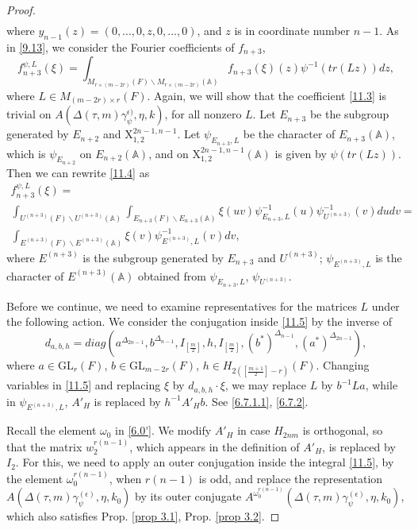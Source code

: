 \documentclass[12pts]{amsart}
\newcommand{\BA}{{\mathbb {A}}}
\newcommand{\GL}{{\mathrm{GL}}}
\begin{document}
\begin{proof}
\begin{multline}
\end{multline}
where $y_{n-1}(z)=(0,...,0,z,0,...,0)$, and $z$ is in coordinate number $n-1$. As in \eqref{9.13}, we consider the Fourier coefficients of $f_{n+3}$,  
\begin{equation}\label{11.4}
f_{n+3}^{\psi,L}(\xi)=\int_{M_{r\times (m-2r)}(F)\backslash M_{r\times (m-2r)}(\BA)}f_{n+3}(\xi)(z)\psi^{-1}(tr(Lz))dz,
\end{equation}
where $L\in M_{(m-2r)\times r}(F)$. Again, we will show that the coefficient \eqref{11.3} is trivial on $A(\Delta(\tau,m)\gamma_\psi^{\epsilon)},\eta,k)$, for all nonzero $L$. Let $E_{n+3}$ be the subgroup generated by $E_{n+2}$ and $\mathrm{X}_{1,2}^{2n-1,n-1}$. Let $\psi_{E_{n+3},L}$ be the character of $E_{n+3}(\BA)$, which is $\psi_{E_{n+2}}$ on $E_{n+2}(\BA)$, and on $\mathrm{X}_{1,2}^{2n-1,n-1}(\BA)$ is given by $\psi(tr(Lz))$. Then we can rewrite \eqref{11.4} as
\begin{multline}\label{11.5}
f_{n+3}^{\psi,L}(\xi)=\\
\int_{U^{(n+3)}(F)\backslash
	U^{(n+3)}(\BA)}\int_{E_{n+3}(F)\backslash E_{n+3}(\BA)}\xi(uv)\psi^{-1}_{E_{n+3},L}(u)\psi^{-1}_{U^{(n+3)}}(v)dudv=\\
\int_{E^{(n+3)}(F)\backslash
	E^{(n+3)}(\BA)}\xi(v)\psi^{-1}_{E^{(n+3)},L}(v)dv	,
\end{multline}
where $E^{(n+3)}$ is the subgroup generated by $E_{n+3}$ and $U^{(n+3)}$; $\psi_{E^{(n+3)},L}$ is the character of $E^{(n+3)}(\BA)$ obtained from $\psi_{E_{n+3},L}$, $\psi_{U^{(n+3)}} $.

Before we continue, we need to examine representatives for the matrices $L$ under the following action. We consider the conjugation inside \eqref{11.5} by the inverse of
$$
d_{a,b,h}=diag(a^{\Delta_{2n-1}}, b^{\Delta_{n-1}} , I_{[\frac{m}{2}]},h, I_{[\frac{m}{2}]}, (b^*)^{\Delta_{n-1}}, (a^*)^{\Delta_{2n-1}}),
$$
where $a\in \GL_r(F)$, $b\in \GL_{m-2r}(F)$, $h\in H_{2([\frac{m+1}{2}]-r)}(F)$. Changing variables in \eqref{11.5} and replacing $\xi$ by $d_{a,b,h}\cdot\xi$, we may replace $L$ by $b^{-1}La$, while in $\psi_{E^{(n+3)},L}$, $A'_H$ is replaced by $h^{-1}A'_Hb$. See \eqref{6.7.1.1}, \eqref{6.7.2}. 

Recall the element $\omega_0$ in \eqref{6.0'}.
We modify $A'_H$ in case $H_{2nm}$ is orthogonal, so that the matrix $w_2^{r(n-1)}$, which appears in the definition of $A'_H$, is replaced by $I_2$. For this, we need to apply an outer conjugation inside the integral \eqref{11.5}, by the element $\omega_0^{r(n-1)}$, when $r(n-1)$ is odd, and replace the representation $A(\Delta(\tau,m)\gamma_\psi^{(\epsilon)},\eta,k_0)$ by its outer conjugate 
 $A^{\omega_0^{r(n-1)}}(\Delta(\tau,m)\gamma_\psi^{(\epsilon)},\eta,k_0)$, which also satisfies Prop. \ref{prop 3.1}, Prop. \ref{prop 3.2}.
 

\end{proof}
\end{document}
